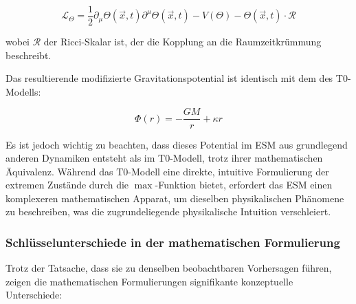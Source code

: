 \documentclass[12pt,a4paper]{article}
\newcommand{\vecx}{\vec{x}}
\begin{document}
	\begin{equation}
		\mathcal{L}_{\Theta} = \frac{1}{2}\partial_{\mu}\Theta(\vecx,t)\partial^{\mu}\Theta(\vecx,t) - V(\Theta) - \Theta(\vecx,t) \cdot \mathcal{R}
	\end{equation}
	
	wobei \(\mathcal{R}\) der Ricci-Skalar ist, der die Kopplung an die Raumzeitkrümmung beschreibt.
	
	Das resultierende modifizierte Gravitationspotential ist identisch mit dem des T0-Modells:
	
	\begin{equation}
		\Phi(r) = -\frac{GM}{r} + \kappa r
	\end{equation}
	
	Es ist jedoch wichtig zu beachten, dass dieses Potential im ESM aus grundlegend anderen Dynamiken entsteht als im T0-Modell, trotz ihrer mathematischen Äquivalenz. Während das T0-Modell eine direkte, intuitive Formulierung der extremen Zustände durch die \(\max\)-Funktion bietet, erfordert das ESM einen komplexeren mathematischen Apparat, um dieselben physikalischen Phänomene zu beschreiben, was die zugrundeliegende physikalische Intuition verschleiert.
	
	\subsubsection{Schlüsselunterschiede in der mathematischen Formulierung}
	\label{subsubsec:math_differences}
	
	Trotz der Tatsache, dass sie zu denselben beobachtbaren Vorhersagen führen, zeigen die mathematischen Formulierungen signifikante konzeptuelle Unterschiede:
	
\end{document}
